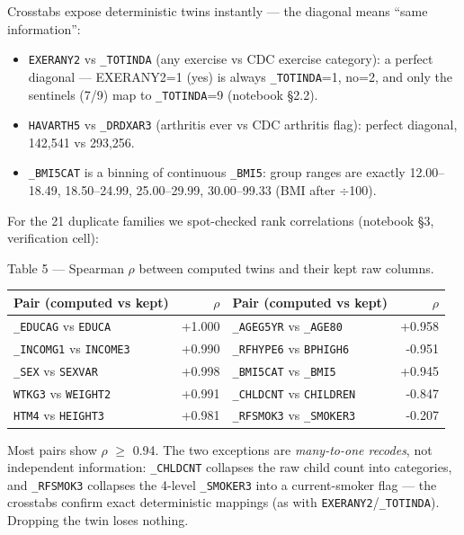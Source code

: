 \documentclass[11pt,a4paper]{article}
\providecommand{\tightlist}{\setlength{\itemsep}{2pt}\setlength{\parskip}{0pt}}
\begin{document}
{Crosstabs expose deterministic twins instantly --- the diagonal means ``same information'':

\begin{itemize}
\tightlist
\item
  \texttt{EXERANY2} vs \texttt{\_TOTINDA} (any exercise vs CDC exercise category): a perfect diagonal --- EXERANY2=1 (yes) is always \texttt{\_TOTINDA}=1, no=2, and only the sentinels (7/9) map to \texttt{\_TOTINDA}=9 (notebook \S{}2.2).
\item
  \texttt{HAVARTH5} vs \texttt{\_DRDXAR3} (arthritis ever vs CDC arthritis flag): perfect diagonal, 142,541 vs 293,256.
\item
  \texttt{\_BMI5CAT} is a binning of continuous \texttt{\_BMI5}: group ranges are exactly 12.00--18.49, 18.50--24.99, 25.00--29.99, 30.00--99.33 (BMI after $\div$100).
\end{itemize}

For the 21 duplicate families we spot-checked rank correlations (notebook \S{}3, verification cell):

Table 5 --- Spearman $\rho$ between computed twins and their kept raw columns.

{\def\LTcaptype{none} %

\begin{center}\small
\begin{tabular}{@{}lrlr@{}}
\toprule\noalign{}
Pair (computed vs kept) & $\rho$ & Pair (computed vs kept) & $\rho$ \\
\midrule\noalign{}
\texttt{\_EDUCAG} vs \texttt{EDUCA} & +1.000 & \texttt{\_AGEG5YR} vs \texttt{\_AGE80} & +0.958 \\
\texttt{\_INCOMG1} vs \texttt{INCOME3} & +0.990 & \texttt{\_RFHYPE6} vs \texttt{BPHIGH6} & -0.951 \\
\texttt{\_SEX} vs \texttt{SEXVAR} & +0.998 & \texttt{\_BMI5CAT} vs \texttt{\_BMI5} & +0.945 \\
\texttt{WTKG3} vs \texttt{WEIGHT2} & +0.991 & \texttt{\_CHLDCNT} vs \texttt{CHILDREN} & -0.847 \\
\texttt{HTM4} vs \texttt{HEIGHT3} & +0.981 & \texttt{\_RFSMOK3} vs \texttt{\_SMOKER3} & -0.207 \\
\bottomrule
\end{tabular}
\end{center}

}

Most pairs show \textbar $\rho$\textbar{} $\ge$ 0.94. The two exceptions are \emph{many-to-one recodes}, not independent information: \texttt{\_CHLDCNT} collapses the raw child count into categories, and \texttt{\_RFSMOK3} collapses the 4-level \texttt{\_SMOKER3} into a current-smoker flag --- the crosstabs confirm exact deterministic mappings (as with \texttt{EXERANY2}/\texttt{\_TOTINDA}). Dropping the twin loses nothing.

}
\end{document}
